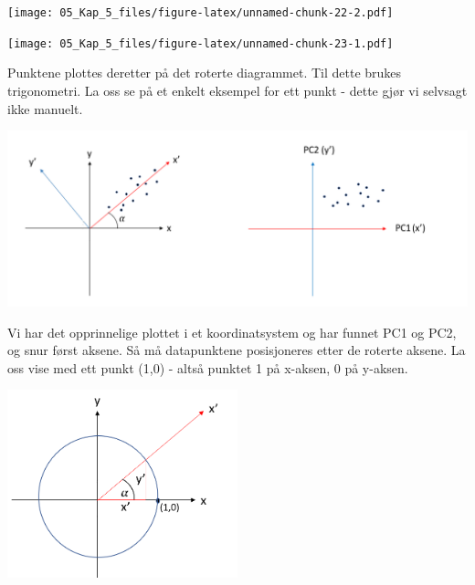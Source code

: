 \documentclass[
]{article}
\newenvironment{Shaded}{\begin{snugshade}}{\end{snugshade}}
\newcommand{\AttributeTok}[1]{\textcolor[rgb]{0.77,0.63,0.00}{#1}}
\newcommand{\CommentTok}[1]{\textcolor[rgb]{0.56,0.35,0.01}{\textit{#1}}}
\newcommand{\DecValTok}[1]{\textcolor[rgb]{0.00,0.00,0.81}{#1}}
\newcommand{\FunctionTok}[1]{\textcolor[rgb]{0.00,0.00,0.00}{#1}}
\newcommand{\NormalTok}[1]{#1}
\newcommand{\OtherTok}[1]{\textcolor[rgb]{0.56,0.35,0.01}{#1}}
\newcommand{\SpecialCharTok}[1]{\textcolor[rgb]{0.00,0.00,0.00}{#1}}
\newcommand{\StringTok}[1]{\textcolor[rgb]{0.31,0.60,0.02}{#1}}
\begin{document}
\texttt{[image: 05\_Kap\_5\_files/figure-latex/unnamed-chunk-22-2.pdf]}

\begin{Shaded}
\end{Shaded}

\texttt{[image: 05\_Kap\_5\_files/figure-latex/unnamed-chunk-23-1.pdf]}

Punktene plottes deretter på det roterte diagrammet. Til dette brukes trigonometri. La oss se på et enkelt eksempel for ett punkt - dette gjør vi selvsagt ikke manuelt.

\includegraphics{rotasjon1.png}

Vi har det opprinnelige plottet i et koordinatsystem og har funnet PC1 og PC2, og snur først aksene. Så må datapunktene posisjoneres etter de roterte aksene. La oss vise med ett punkt (1,0) - altså punktet 1 på x-aksen, 0 på y-aksen.

\includegraphics[width=0.5\textwidth,height=\textheight]{rotasjon2.png}
\end{document}
